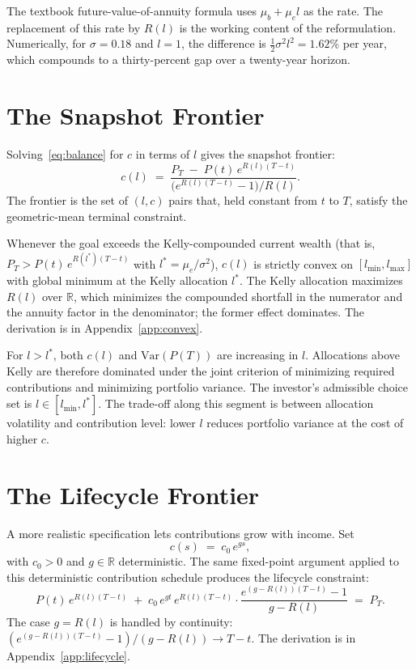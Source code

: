 \documentclass[11pt]{article}
\begin{document}
The textbook future-value-of-annuity formula uses $\mu_b + \mu_e l$
as the rate. The replacement of this rate by $R(l)$ is the working
content of the reformulation. Numerically, for $\sigma = 0.18$ and
$l = 1$, the difference is $\tfrac12 \sigma^2 l^2 = 1.62\%$ per year,
which compounds to a thirty-percent gap over a twenty-year horizon.

\section{The Snapshot Frontier}
\label{sec:snapshot}

Solving~\eqref{eq:balance} for $c$ in terms of $l$ gives the
snapshot frontier:
\begin{equation}
  \label{eq:modeA}
  \boxed{
  c(l) \;=\;
  \frac{P_T \;-\; P(t)\,e^{R(l)(T-t)}}{\bigl(e^{R(l)(T-t)} - 1\bigr) / R(l)}.
  }
\end{equation}
The frontier is the set of $(l, c)$ pairs that, held constant from
$t$ to $T$, satisfy the geometric-mean terminal constraint.

Whenever the goal exceeds the Kelly-compounded current wealth (that
is, $P_T > P(t)\, e^{R(l^*)(T-t)}$ with $l^* = \mu_e/\sigma^2$),
$c(l)$ is strictly convex on $[l_{\min}, l_{\max}]$ with global
minimum at the Kelly allocation $l^*$. The Kelly allocation maximizes
$R(l)$ over $\mathbb{R}$, which minimizes the compounded shortfall in
the numerator and the annuity factor in the denominator; the former
effect dominates. The derivation is in Appendix~\ref{app:convex}.

For $l > l^*$, both $c(l)$ and $\mathrm{Var}(P(T))$ are increasing in
$l$. Allocations above Kelly are therefore dominated under the joint
criterion of minimizing required contributions and minimizing
portfolio variance. The investor's admissible choice set is $l \in
[l_{\min}, l^*]$. The trade-off along this segment is between
allocation volatility and contribution level: lower $l$ reduces
portfolio variance at the cost of higher $c$.

\section{The Lifecycle Frontier}
\label{sec:lifecycle}

A more realistic specification lets contributions grow with income.
Set
\begin{equation}
  c(s) \;=\; c_0\, e^{g s},
\end{equation}
with $c_0 > 0$ and $g \in \mathbb{R}$ deterministic. The same
fixed-point argument applied to this deterministic contribution
schedule produces the lifecycle constraint:
\begin{equation}
  \label{eq:modeB}
  \boxed{
  P(t)\, e^{R(l)(T-t)}
  \;+\; c_0\, e^{gt}\, e^{R(l)(T-t)}\cdot \frac{e^{(g - R(l))(T-t)} - 1}{g - R(l)}
  \;=\; P_T.
  }
\end{equation}
The case $g = R(l)$ is handled by continuity:
$(e^{(g-R(l))(T-t)} - 1)/(g - R(l)) \to T - t$. The derivation is in
Appendix~\ref{app:lifecycle}.
\end{document}
